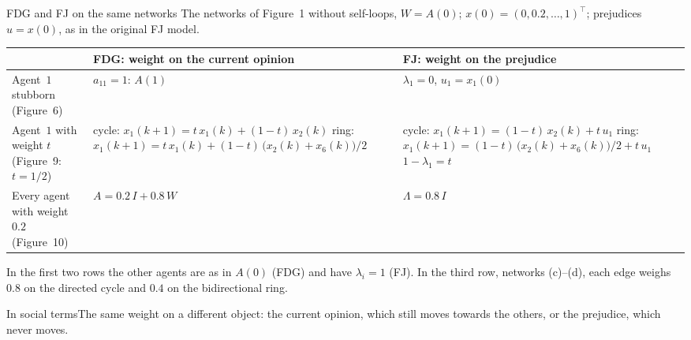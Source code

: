 \documentclass[10pt, aspectratio=169]{beamer}
\newcommand{\socially}[1]{%
  \begin{minipage}{0.76\textwidth}
    \begin{exampleblock}{In social terms}\footnotesize #1\end{exampleblock}
  \end{minipage}}
\begin{document}
\begin{frame}[label=m-fj-networks]{FDG and FJ on the same networks}
  \small
  The networks of Figure~1 without self-loops, $W = A(0)$;
  $x(0) = (0, 0.2, \dots, 1)^\top$; prejudices $u = x(0)$, as in the original FJ model.

  \medskip
  \scriptsize
  \renewcommand{\arraystretch}{1.6}
  \begin{tabular}{>{\raggedright\arraybackslash}p{}
                  >{\raggedright\arraybackslash}p{}
                  >{\raggedright\arraybackslash}p{}}
    \toprule
    & \textbf{FDG}: weight on the current opinion & \textbf{FJ}: weight on the prejudice \\
    \midrule
    Agent~$1$ stubborn (Figure~6) & $a_{11} = 1$: $A(1)$
      & $\lambda_1 = 0$, $u_1 = x_1(0)$ \\
    Agent~$1$ with weight $t$ (Figure~9: $t = 1/2$)
      & cycle: $x_1(k+1) = t\,x_1(k) + (1-t)\,x_2(k)$\newline
        ring: $x_1(k+1) = t\,x_1(k) + (1-t)\,\bigl(x_2(k) + x_6(k)\bigr)/2$
      & cycle: $x_1(k+1) = (1-t)\,x_2(k) + t\,u_1$\newline
        ring: $x_1(k+1) = (1-t)\,\bigl(x_2(k) + x_6(k)\bigr)/2 + t\,u_1$\newline
        $1 - \lambda_1 = t$ \\
    Every agent with weight $0.2$ (Figure~10)
      & $A = 0.2\,I + 0.8\,W$ & $\Lambda = 0.8\,I$ \\
    \bottomrule
  \end{tabular}

  \smallskip
  \footnotesize In the first two rows the other agents are as in $A(0)$ (FDG) and have
  $\lambda_i = 1$ (FJ).
  In the third row, networks (c)--(d), each edge weighs $0.8$ on the directed cycle and
  $0.4$ on the bidirectional ring.
  \socially{The same weight on a different object: the current opinion, which still moves
  towards the others, or the prejudice, which never moves.}
\end{frame}
\end{document}
